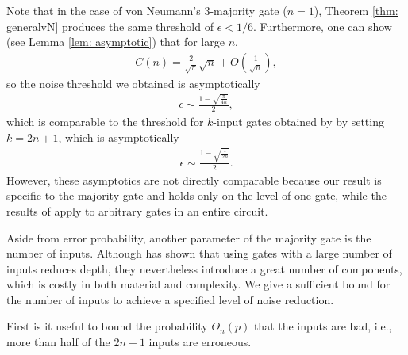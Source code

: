 \documentclass[12pt,reqno]{amsart}
\theoremstyle{plain} %
\theoremstyle{remark}
\theoremstyle{definition}
\newcommand{\fix}[1]{{\color{red} \sf FIX: [#1]}}
\begin{document}
Note that in the case of von Neumann's $3$-majority gate ($n=1$), Theorem \ref{thm: generalvN} produces the same threshold of $\epsilon<1/6$. Furthermore, one can show (see Lemma \ref{lem: asymptotic}) that for large $n$,
\begin{align}
    C(n)=\frac{2}{\sqrt{\pi}}\sqrt{n}+O\left(\frac{1}{\sqrt{n}}\right),
\end{align}
so the noise threshold we obtained is asymptotically
\begin{align}
    \epsilon\sim\frac{1-\sqrt{\frac{\pi}{4n}}}{2},
\end{align}
which is comparable to the threshold for $k$-input gates obtained by \cite{ES} by setting $k=2n+1$, which is asymptotically
\begin{align}
    \epsilon\sim\frac{1-\sqrt{\frac{1}{2n}}}{2}.
\end{align}
However, these asymptotics are not directly comparable because our result is specific to the majority gate and holds only on the level of one gate, while the results of \cite{ES} apply to arbitrary gates in an entire circuit.

Aside from error probability, another parameter of the majority gate is the number of inputs. Although \cite{ES} has shown that using gates with a large number of inputs reduces depth, they nevertheless introduce a great number of components, which is costly in both material and complexity. We give a sufficient bound for the number of inputs to achieve a specified level of noise reduction.

First is it useful to bound the probability $\Theta_n(p)$ that the inputs are bad, i.e., more than half of the $2n+1$ inputs are erroneous.

\end{document}
